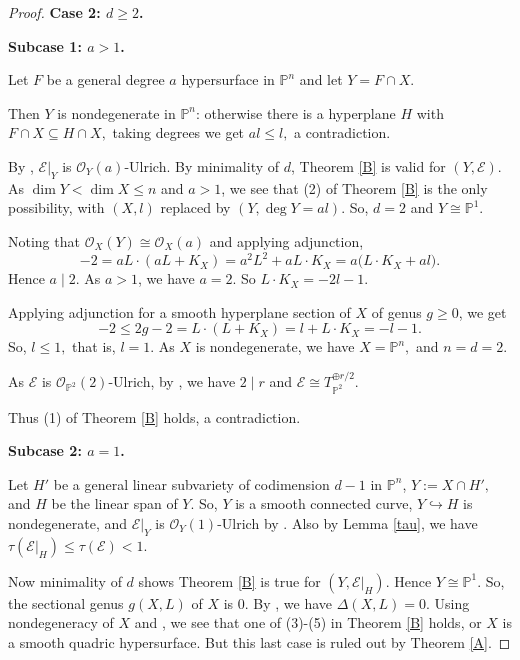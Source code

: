 \documentclass[11pt,letterpaper]{amsart}
\begin{document}
\begin{proof}
\medskip

\noindent
\textbf{Case 2: $d\ge 2$.}

\medskip

\noindent
\textbf{Subcase 1: $a>1$.}

Let $F$ be a general degree $a$ hypersurface in $\mathbb P^n$ and let $Y=F\cap X.$

Then $Y$ is nondegenerate in $\mathbb P^n$: otherwise there is a hyperplane
$H$ with $F\cap X\subseteq H\cap X,$ taking degrees we get $al\le l,$
a contradiction.

By \cite[\S 2, (2.4)]{beauville2018introduction}, $\mathcal E|_Y$ is $\mathcal O_Y(a)$-Ulrich.
By minimality of $d$, Theorem \ref{B} is valid for $(Y,\mathcal E)$.
As $\dim Y<\dim X\le n$
and $a>1$, we see that (2) of Theorem \ref{B} is the only possibility, with $(X,l)$ replaced by
$(Y,\deg Y=al)$. So, $d=2$ and $Y\cong \mathbb P^1.$

Noting that $\mathcal O_X(Y)\cong \mathcal O_X(a)$
and applying adjunction,
\[
-2=aL\cdot(aL+K_X)
=a^2L^2+aL\cdot K_X
=a\bigl(L\cdot K_X+al\bigr).
\]
Hence $a\mid 2.$ As $a>1$, we have $a=2.$ So $L\cdot K_X=-2l-1.$

Applying adjunction for a smooth hyperplane section of $X$ of genus $g\ge 0$, we get
\[
-2\le 2g-2=L\cdot(L+K_X)
=l+L\cdot K_X
=-l-1.
\]
So, $l\le 1,$ that is, $l=1.$ As $X$ is nondegenerate, we have $X=\mathbb P^n,$ and 
$n=d=2.$

As $\mathcal E$ is $\mathcal O_{\mathbb{P}^2}(2)$-Ulrich, by
\cite[\S 5]{coskun2017ulrich}, we have  $2\mid r$ and $\mathcal E\cong T_{\mathbb P^2}^{\oplus r/2}.$

Thus (1) of Theorem \ref{B} holds, a contradiction.

\medskip

\noindent
\textbf{Subcase 2: $a=1$.}

Let $H'$ be a general linear subvariety of codimension $d-1$ in
$\mathbb P^n$, $Y:=X\cap H',$ and $H$ be the linear span of $Y$.
So, $Y$ is a smooth connected curve, $Y\hookrightarrow H$ is
nondegenerate, and $\mathcal E|_Y$ is $\mathcal O_Y(1)$-Ulrich by \cite[\S 2, (2.4)]{beauville2018introduction}.
Also by Lemma \ref{tau}, we have $\tau(\mathcal E|_H)\le \tau(\mathcal E)<1.$

Now minimality of $d$ shows Theorem \ref{B} is true for
$(Y,\mathcal E|_H)$. Hence $Y\cong \mathbb P^1$. So, the sectional genus $g(X,L)$ of $X$ is $0$. By \cite[Theorem 1.2]{horing2010sectional}, we have $\Delta (X,L)=0.$ Using nondegeneracy of $X$ and \cite[Corollary 4.3 and Theorem 4.9]{fujita1982polarized}, we see that one of (3)-(5) in Theorem \ref{B} holds, or $X$ is a smooth quadric hypersurface. But this last case is ruled out by Theorem \ref{A}.


\end{proof}
\end{document}
